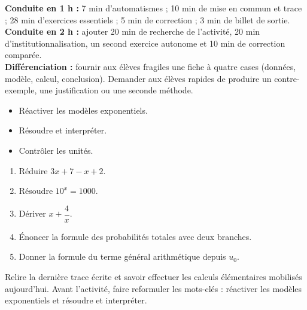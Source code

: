 \ifmxteacher
\begin{method}
\textbf{Conduite en 1 h :} 7 min d'automatismes ; 10 min de mise en commun et trace ; 28 min d'exercices essentiels ; 5 min de correction ; 3 min de billet de sortie.\\
\textbf{Conduite en 2 h :} ajouter 20 min de recherche de l'activité, 20 min d'institutionnalisation, un second exercice autonome et 10 min de correction comparée.\\
\textbf{Différenciation :} fournir aux élèves fragiles une fiche à quatre cases (données, modèle, calcul, conclusion). Demander aux élèves rapides de produire un contre-exemple, une justification ou une seconde méthode.
\end{method}
\fi
{}
\begin{objectives}\begin{itemize}\item Réactiver les modèles exponentiels.\item Résoudre et interpréter.\item Contrôler les unités.\end{itemize}\end{objectives}
\begin{fluency}\begin{enumerate}\item Réduire $3x+7-x+2$. \item Résoudre $10^x=1000$. \item Dériver $x+\dfrac4x$. \item Énoncer la formule des probabilités totales avec deux branches. \item Donner la formule du terme général arithmétique depuis $u_0$. \end{enumerate}\end{fluency}
\begin{prerequisites}Relire la dernière trace écrite et savoir effectuer les calculs élémentaires mobilisés aujourd'hui. Avant l'activité, faire reformuler les mots-clés : réactiver les modèles exponentiels et résoudre et interpréter.\end{prerequisites}

